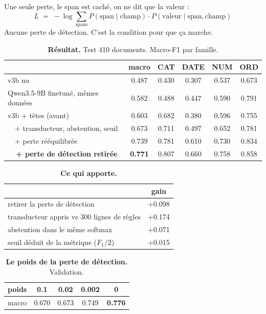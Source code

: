 \documentclass[11pt,a4paper]{article}
\begin{document}
\vspace{0.5em}
Une seule perte, le span est caché, on ne dit que la valeur :
\[
L \;=\; -\log \sum_{\text{spans}} P(\text{span}\mid\text{champ})\cdot P(\text{valeur}\mid\text{span},\text{champ})
\]
Aucune perte de détection. C'est la condition pour que ça marche.

\vspace{1.5em}

\begin{table}[h]\centering
\caption*{\textbf{Résultat.} Test 410 documents. Macro-F1 par famille.}
\begin{tabular}{lccccc}
\toprule
 & macro & CAT & DATE & NUM & ORD \\
\midrule
v3b nu                                  & 0.487 & 0.430 & 0.307 & 0.537 & 0.673 \\
Qwen3.5-9B finetuné, mêmes données      & 0.582 & 0.488 & 0.447 & 0.590 & 0.791 \\
v3b + têtes (avant)                     & 0.603 & 0.682 & 0.380 & 0.596 & 0.755 \\
\ \ + transducteur, abstention, seuil   & 0.673 & 0.711 & 0.497 & 0.652 & 0.781 \\
\ \ + perte rééquilibrée                & 0.739 & 0.781 & 0.610 & 0.730 & 0.834 \\
\textbf{\ \ + perte de détection retirée} & \textbf{0.771} & 0.807 & 0.660 & 0.758 & 0.858 \\
\bottomrule
\end{tabular}
\end{table}

\begin{table}[h]\centering
\caption*{\textbf{Ce qui apporte.}}
\begin{tabular}{lc}
\toprule
 & gain \\
\midrule
retirer la perte de détection        & +0.098 \\
transducteur appris vs 300 lignes de règles & +0.174 \\
abstention dans le même softmax      & +0.071 \\
seuil déduit de la métrique ($F_1/2$) & +0.015 \\
\bottomrule
\end{tabular}
\end{table}

\begin{table}[h]\centering
\caption*{\textbf{Le poids de la perte de détection.} Validation.}
\begin{tabular}{lcccc}
\toprule
poids & 0.1 & 0.02 & 0.002 & \textbf{0} \\
\midrule
macro & 0.670 & 0.673 & 0.749 & \textbf{0.776} \\
\bottomrule
\end{tabular}
\end{table}
\end{document}

